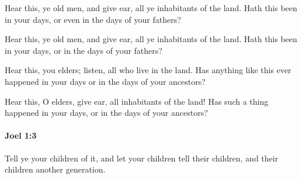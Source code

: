 			Hear this, ye old men, and give ear, all ye inhabitants of the land. Hath this been in your days, or even in the days of your fathers?

			\begin{versebox}
					\item[BHS] 
					\item[LXX] 
					\item[ASV] Hear this, ye old men, and give ear, all ye inhabitants of the land. Hath this been in your days, or in the days of your fathers?
					\item[NIV] Hear this, you elders; listen, all who live in the land. Has anything like this ever happened in your days or in the days of your ancestors?
					\item[NRSV] Hear this, O elders, give ear, all inhabitants of the land! Has such a thing happened in your days, or in the days of your ancestors?
			\end{versebox}

		\paragraph{Joel 1:3} %
			\label{JOEL-1-3}

			Tell ye your children of it, and let your children tell their children, and their children another generation.

